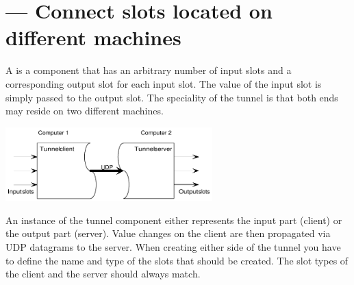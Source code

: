 
\section{ ---
         Connect slots located on different machines}

A  is a component that has an arbitrary number of input slots
and a corresponding output slot for each input slot. The value of the
input slot is simply passed to the output slot. The speciality of the
tunnel is that both ends may reside on two different machines.

\begin{center}
\includegraphics[width=8cm]{pics/tunnel}
\end{center}

An instance of the tunnel component either represents the input part
(client) or the output part (server). Value changes on the client are
then propagated via UDP datagrams to the server. When creating either
side of the tunnel you have to define the name and type of the slots
that should be created. The slot types of the client and the server
should always match.


